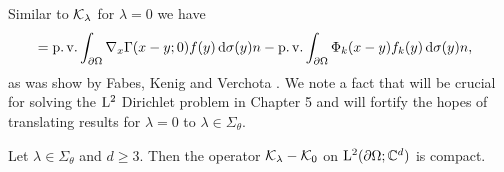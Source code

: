 Similar to $\mathcal{K}_\lambda$ for $\lambda = 0$ we have
\begin{align}
  \label{eq:defnK0}
    &= \operatorname{p. v.} \int_{\partial\Omega} \nabla_x \Gamma(x - y; 0)  f(y) \, {\operatorname{d}\!{\sigma}}(y) n - \operatorname{p. v.} \int_{\partial\Omega} \Phi_k(x - y) f_k(y) \, {\operatorname{d}\!{\sigma}}(y) n,
\end{align}
as was show by Fabes, Kenig and Verchota \cite[(0.12)]{fabesKenigVerchota}.
We note a fact that will be crucial for solving the $\mathrm{L}^2$ Dirichlet problem in Chapter 5 and will fortify the hopes of translating results for $\lambda = 0$ to $\lambda \in \Sigma_\theta$.
\begin{lem}
  \label{lem:compactness}
  Let $\lambda \in \Sigma_\theta$ and $d \geq 3$.
  Then the operator $\mathcal{K}_\lambda - \mathcal{K}_0$ on $\mathrm{L}^2(\partial\Omega; \mathbb{C}^d)$ is compact.
\end{lem}

